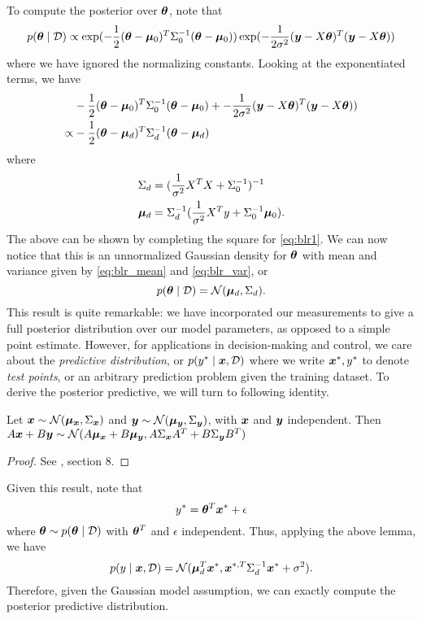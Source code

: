 To compute the posterior over $\bm{\theta}$, note that 
\begin{equation}
p(\bm{\theta} \mid \mathcal{D}) \propto \exp(-\frac{1}{2}(\bm{\theta} - \bm{\mu}_0)^T \Sigma_0^{-1} (\bm{\theta} - \bm{\mu}_0)) \exp(-\frac{1}{2\sigma^2} (\bm{y} - X \bm{\theta})^T (\bm{y} - X \bm{\theta}) )
\end{equation}
where we have ignored the normalizing constants. Looking at the exponentiated terms, we have 
\begin{align}
    & -\frac{1}{2}(\bm{\theta} - \bm{\mu}_0)^T \Sigma_0^{-1} (\bm{\theta} - \bm{\mu}_0) + -\frac{1}{2\sigma^2} (\bm{y} - X \bm{\theta})^T (\bm{y} - X \bm{\theta}) ) \label{eq:blr1}\\
    \propto & -\frac{1}{2} (\bm{\theta} - \bm{\mu}_{d})^T \Sigma_{d}^{-1} (\bm{\theta} - \bm{\mu}_{d})
\end{align}
where
\begin{align}
    \Sigma_{d} &= (\frac{1}{\sigma^2} X^T X + \Sigma_0^{-1})^{-1} \label{eq:blr_var}\\
    \bm{\mu}_{d} &= \Sigma_{d}^{-1} (\frac{1}{\sigma^2} X^T y + \Sigma_0^{-1} \bm{\mu}_0) \label{eq:blr_mean}.
\end{align}
The above can be shown by completing the square for \eqref{eq:blr1}. We can now notice that this is an unnormalized Gaussian density for $\bm{\theta}$ with mean and variance given by \eqref{eq:blr_mean} and \eqref{eq:blr_var}, or
\begin{equation}
    p(\bm{\theta} \mid \mathcal{D}) = \mathcal{N}(\bm{\mu}_{d}, \Sigma_{d}).
\end{equation}
This result is quite remarkable: we have incorporated our measurements to give a full posterior distribution over our model parameters, as opposed to a simple point estimate. However, for applications in decision-making and control, we care about the \textit{predictive distribution}, or $p(y^* \mid \bm{x}, \mathcal{D})$ where we write $\bm{x}^*, y^*$ to denote \textit{test points}, or an arbitrary prediction problem given the training dataset. To derive the posterior predictive, we will turn to following identity.
\begin{lemma}
Let $\bm{x} \sim \mathcal{N}(\bm{\mu}_{\bm{x}}, \Sigma_{\bm{x}})$ and $\bm{y} \sim \mathcal{N}(\bm{\mu}_{\bm{y}}, \Sigma_{\bm{y}})$, with $\bm{x}$ and $\bm{y}$ independent. Then $A \bm{x} + B \bm{y} \sim \mathcal{N} (A \bm{\mu}_{\bm{x}} + B \bm{\mu}_{\bm{y}}, A \Sigma_{\bm{x}} A^T + B \Sigma_{\bm{y}} B^T)$
\end{lemma}
\begin{proof}
See \cite{petersenmatrix}, section 8.
\end{proof}
Given this result, note that 
\begin{equation}
    y^* = \bm{\theta}^T \bm{x}^* + \epsilon
\end{equation}
where $\bm{\theta} \sim p(\bm{\theta}\mid \mathcal{D})$ with $\bm{\theta}^T$ and $\epsilon$ independent. Thus, applying the above lemma, we have
\begin{equation}
    p(y\mid \bm{x}, \mathcal{D}) = \mathcal{N}(\bm{\mu}_{d}^T \bm{x}^*, \bm{x}^{*,T} \Sigma^{-1}_{d} \bm{x}^* + \sigma^2).
\end{equation}
Therefore, given the Gaussian model assumption, we can exactly compute the posterior predictive distribution.

